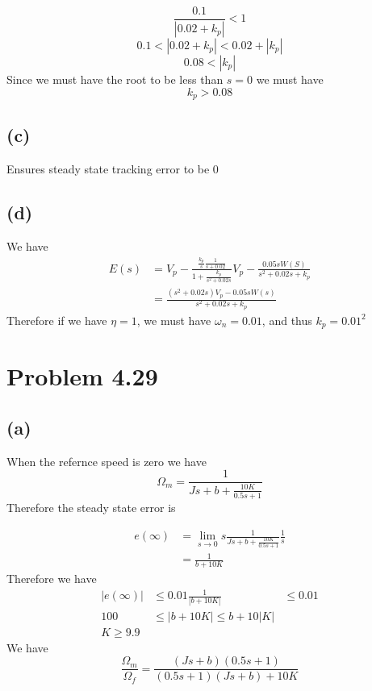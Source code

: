 \documentclass[12pt]{article}
\begin{document}
$$\frac{0.1}{|0.02+k_p|}<1$$
$$0.1<|0.02+k_p|<0.02+|k_p|$$
$$0.08<|k_p|$$
Since we must have the root to be less than $s=0$ we must have
$$\boxed{k_p>0.08}$$
\subsection*{(c)}
Ensures steady state tracking error to be $0$
\subsection*{(d)}
We have
\begin{align*}
    E(s)&=V_p-\frac{\frac{k_p}{s}\frac{1}{s+0.02}}{1+\frac{k_p}{s^2+0.02s}}
V_p-\frac{0.05sW(S)}{s^2+0.02s+k_p}\\
&=\frac{(s^2+0.02s)V_p-0.05sW(s)}{s^2+0.02s+k_p}
\end{align*}
Therefore if we have $\eta=1$, we must have $\omega_n=0.01$, and thus $\boxed{k_p=0.01^2}$
\section*{Problem 4.29}
\subsection*{(a)}
When the refernce speed is zero we have
$$\Omega_m=\frac{1}{Js+b+\frac{10K}{0.5s+1}}$$
Therefore the steady state error is

\begin{align*}
    e(\infty)&=\lim_{s\to0}s\frac{1}{Js+b+\frac{10K}{0.5s+1}}\frac{1}{s}\\
    &=\frac{1}{b+10K}
\end{align*}
Therefore we have
\begin{align*}
    |e(\infty)|&\leq 0.01
    \frac{1}{|b+10K|}&\leq 0.01\\
    100&\leq|b+10K|\leq b+10|K|\\
    \boxed{K\geq 9.9}
\end{align*}
We have
$$\frac{\Omega_m}{\Omega_f}=\frac{(Js+b)(0.5s+1)}{(0.5s+1)(Js+b)+10K}$$
\end{document}
